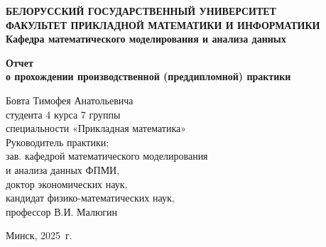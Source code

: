 \documentclass[a4paper, 14pt]{extreport}
\numberwithin{equation}{section}
\renewcommand{\contentsname}%
	{\centering \large ОГЛАВЛЕНИЕ}%
\numberwithin{equation}{section}
\begin{document}
	\def\contentsname{ОГЛАВЛЕНИЕ}
	
	\def\contentsname{ОГЛАВЛЕНИЕ}
	
	\begin{titlepage}
		\begin{center}
			\textbf{БЕЛОРУССКИЙ ГОСУДАРСТВЕННЫЙ УНИВЕРСИТЕТ
				\\[5mm]
				{ФАКУЛЬТЕТ ПРИКЛАДНОЙ МАТЕМАТИКИ И ИНФОРМАТИКИ}\\[2mm]
				Кафедра математического моделирования и анализа данных
			}
			
			\vfill
			
			\textbf{Отчет
				\\[3mm]
				о прохождении производственной (преддипломной) практики
				\\[26mm]
			}
		\end{center}
		
		\hfill
		\begin{minipage}{.7\textwidth}
			\begin{flushright}
				Бовта Тимофея Анатольевича\\
				студента 4 курса 7 группы\\
				специальности «Прикладная математика»\\[5mm]
				
				Руководитель практики:\\[2mm] 
				зав. кафедрой математического моделирования\\
				и анализа данных ФПМИ,\\
				доктор экономических наук,\\
				кандидат физико-математических наук,\\
				профессор В.И. Малюгин
				
				
			\end{flushright}
		\end{minipage}
		\vfill
		\begin{center}
			Минск, 2025\ г.
		\end{center}
	\end{titlepage}
	\newpage
	\setcounter{page}{2}
\end{document}
